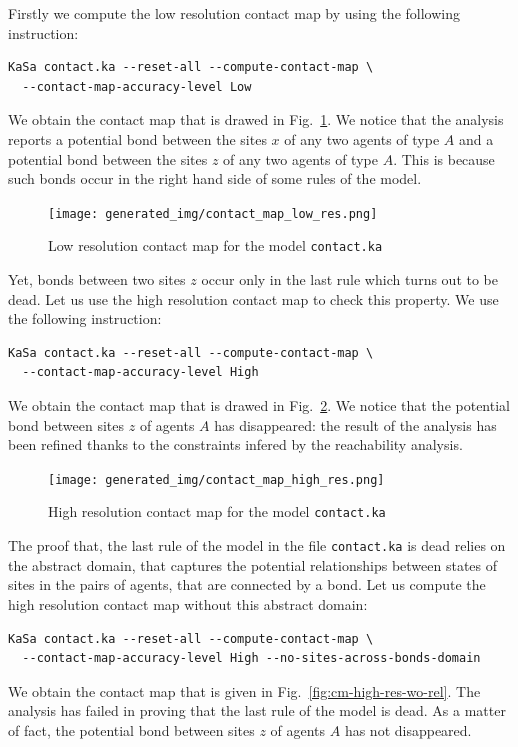 \documentclass[11pt]{book}
\begin{document}
Firstly we compute the low resolution contact map by using the following instruction:
\begin{verbatim}
KaSa contact.ka --reset-all --compute-contact-map \
  --contact-map-accuracy-level Low
\end{verbatim}

We obtain the contact map that is drawed in Fig.~\ref{fig:cm-low-res}. We notice that the analysis reports a potential bond between the sites $x$ of any two agents of type $A$ and a potential bond between the sites $z$ of any two agents of type $A$. This is because such bonds occur in the right hand side of some rules of the model.


\begin{figure}[htbp]
\centering
\texttt{[image: generated\_img/contact\_map\_low\_res.png]}
\caption{Low resolution contact map for the model \texttt{contact.ka}}
\label{fig:cm-low-res}
\end{figure}

Yet, bonds between two sites $z$ occur only in the last rule which turns out to be dead. Let us use the  high resolution contact map to check this property. We use the following instruction:
\begin{verbatim}
KaSa contact.ka --reset-all --compute-contact-map \
  --contact-map-accuracy-level High
\end{verbatim}

We obtain the contact map that is drawed in Fig.~\ref{fig:cm-high-res}. We notice that the potential bond between sites $z$ of agents $A$ has disappeared: the result of the analysis has been refined thanks to the constraints infered by the reachability analysis.

\begin{figure}[htbp]
\centering
\texttt{[image: generated\_img/contact\_map\_high\_res.png]}
\caption{High resolution contact map for the model \texttt{contact.ka}}
\label{fig:cm-high-res}
\end{figure}

The proof that, the last rule of the model in the file \texttt{contact.ka} is dead relies on the abstract domain, that captures the potential relationships between states of sites in the pairs of agents, that are connected by a bond. Let us compute the high resolution contact map without this abstract domain:
\begin{verbatim}
KaSa contact.ka --reset-all --compute-contact-map \
  --contact-map-accuracy-level High --no-sites-across-bonds-domain
\end{verbatim}
We obtain the contact map that is given in Fig.~\ref{fig:cm-high-res-wo-rel}. The analysis has failed in proving that the last rule of the model is dead. As a matter of fact, the potential bond between sites $z$ of agents $A$ has not disappeared.
\end{document}
